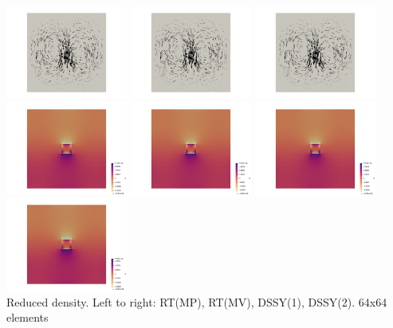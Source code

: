 \begin{center}
\includegraphics[width=4cm]{python_codes/fieldstone_77/results/block/reduced/vels2}
\includegraphics[width=4cm]{python_codes/fieldstone_77/results/block/reduced/vels3}
\includegraphics[width=4cm]{python_codes/fieldstone_77/results/block/reduced/vels4}\\
\includegraphics[width=4cm]{python_codes/fieldstone_77/results/block/reduced/press1}
\includegraphics[width=4cm]{python_codes/fieldstone_77/results/block/reduced/press2}
\includegraphics[width=4cm]{python_codes/fieldstone_77/results/block/reduced/press3}
\includegraphics[width=4cm]{python_codes/fieldstone_77/results/block/reduced/press4}\\
{\captionfont Reduced density. Left to right: RT(MP), RT(MV), DSSY(1), DSSY(2). 64x64 elements}
\end{center}


